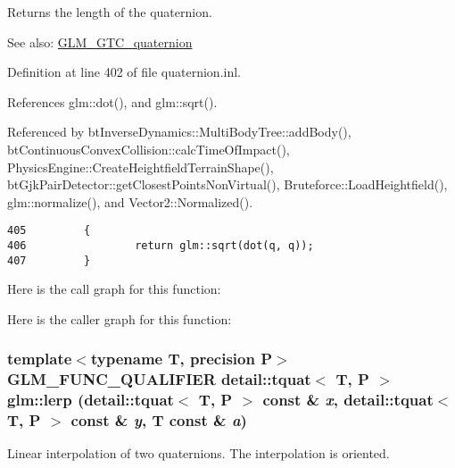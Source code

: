 Returns the length of the quaternion.

\begin{Desc}
\item[See also:]\hyperlink{group__gtc__quaternion}{GLM\_\-GTC\_\-quaternion} \end{Desc}


Definition at line 402 of file quaternion.inl.

References glm::dot(), and glm::sqrt().

Referenced by btInverseDynamics::MultiBodyTree::addBody(), btContinuousConvexCollision::calcTimeOfImpact(), PhysicsEngine::CreateHeightfieldTerrainShape(), btGjkPairDetector::getClosestPointsNonVirtual(), Bruteforce::LoadHeightfield(), glm::normalize(), and Vector2::Normalized().

\begin{Code}\begin{verbatim}405         {
406                 return glm::sqrt(dot(q, q));
407         }
\end{verbatim}
\end{Code}




Here is the call graph for this function:

Here is the caller graph for this function:\hypertarget{group__gtc__quaternion_g7bdb11ee6bfad4eafe2cb71337353ca4}{
\subsubsection[lerp]{\setlength{\rightskip}{0pt plus 5cm}template$<$typename T, precision P$>$ GLM\_\-FUNC\_\-QUALIFIER detail::tquat$<$ T, P $>$ glm::lerp (detail::tquat$<$ T, P $>$ const \& {\em x}, \/  detail::tquat$<$ T, P $>$ const \& {\em y}, \/  T const \& {\em a})}}
\label{group__gtc__quaternion_g7bdb11ee6bfad4eafe2cb71337353ca4}


Linear interpolation of two quaternions. The interpolation is oriented.


